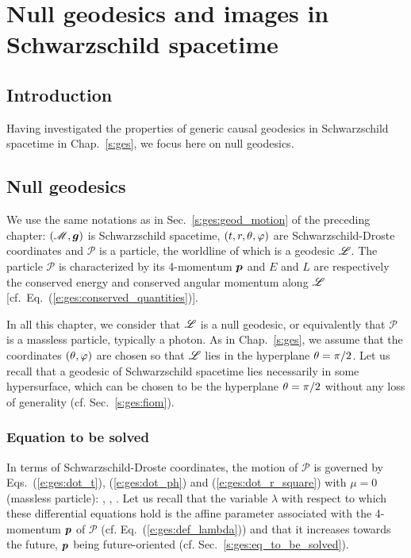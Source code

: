 \chapter{Null geodesics and images in Schwarzschild spacetime}
\label{s:gis}

\minitoc

\section{Introduction}

Having investigated the properties of generic causal geodesics
in Schwarzschild spacetime in Chap.~\ref{s:ges}, we focus here on null
geodesics.

\section{Null geodesics} \label{s:ges:null}

We use the same notations as in Sec.~\ref{s:ges:geod_motion} of the preceding
chapter: $(\mathscr{M}, \bm{g})$ is Schwarzschild spacetime, $(t,r,\theta,\varphi)$ are
Schwarzschild-Droste coordinates and
$\mathscr{P}$ is a particle, the worldline of which is a
geodesic $\mathscr{L}$. The particle $\mathscr{P}$ is characterized by its
4-momentum $\bm{p}$ and
$E$ and $L$ are respectively the conserved energy and conserved angular momentum
along $\mathscr{L}$ [cf.~Eq.~(\ref{e:ges:conserved_quantities})].


In all this chapter, we consider that $\mathscr{L}$ is a null geodesic, or equivalently that
$\mathscr{P}$ is a massless particle, typically a photon.
As in Chap.~\ref{s:ges}, we assume that the coordinates $(\theta,\varphi)$ are chosen
so that $\mathscr{L}$ lies in the hyperplane $\theta=\pi/2$. Let us recall that
a geodesic of Schwarzschild spacetime lies necessarily in some hypersurface, which
can be chosen to be the hyperplane $\theta=\pi/2$ without any loss of generality
(cf. Sec.~\ref{s:ges:fiom}).

\subsection{Equation to be solved}

In terms of Schwarzschild-Droste coordinates, the motion of $\mathscr{P}$ is governed by Eqs.~(\ref{e:ges:dot_t}), (\ref{e:ges:dot_ph}) and (\ref{e:ges:dot_r_square})
with $\mu=0$ (massless particle):
\be \label{e:ges:dot_t_null}
    ,
\ee
\be \label{e:ges:dot_ph_null}
   ,
\ee
\be \label{e:ges:dot_r_square_null}
   .
\ee
Let us recall that the variable $\lambda$ with respect to which these differential equations
hold
is the affine parameter associated with the 4-momentum $\bm{p}$ of $\mathscr{P}$
(cf. Eq.~(\ref{e:ges:def_lambda})) and that it increases towards the future,
$\bm{p}$ being future-oriented (cf. Sec.~\ref{s:ges:eq_to_be_solved}).

